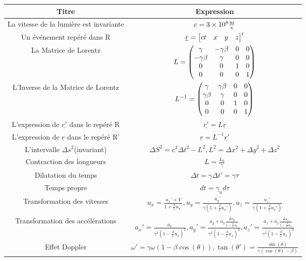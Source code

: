 \documentclass[french]{article}
\begin{document}
	\begin{center}
		\begin{tabular}{| c | c |}
			\hline
			\textbf{Titre} & \textbf{Expression}\\
			\hline
			La vitesse de la lumière est invariante&$c = 3\times10^8 \si{\frac{\meter}{\second}}$\\
			\hline
			Un événement repéré dans R&$ \underline{r}=\mqty[c t& x&y&z]^t $ \\
			\hline
			La Matrice de Lorentz &$L = \mqty(\gamma & -\gamma\beta & 0 & 0 \\ -\gamma\beta& \gamma&0&0\\0&0&1&0\\0&0&0&1)$\\
			\hline
			L'Inverse de la Matrice de Lorentz&$L^{-1} = \mqty(\gamma & \gamma\beta & 0 & 0 \\ \gamma\beta& \gamma&0&0\\0&0&1&0\\0&0&0&1)$\\
			\hline
			L'expression de $\underline{r'}$ dans le repéré R&$\underline{r'}=L\underline{r}$\\
			\hline
			L'expression de $\underline{r}$ dans le repéré R' &$\underline{r}=L^{-1}\underline{r'}$\\
			\hline
			L’intervalle $\Delta s ^2$(invariant)&$\Delta S^2=c^2 \Delta t ^2-L^2, L^2=\Delta x ^2 +\Delta y ^2 + \Delta z ^2$\\
		\hline
		Contraction des longueurs&$L=\frac{L_0}{\gamma}$\\
		\hline
		Dilatation du temps&$\Delta t = \gamma \Delta t' = \gamma \tau$  \\
		\hline
		Temps propre& $dt=\gamma_ud\tau$\\
		\hline
		Transformation des vitesses&$u_x = \frac{u_x'+V}{1 +\frac{\beta}{c}u_x'},
				 u_y = \frac{u_y'}{\gamma(1 +\frac{\beta}{c}u_x')}, 
				 u_z = \frac{u_z'}{\gamma(1 +\frac{\beta}{c}u_x')}$\\
		\hline
Transformation des accélérations&
	$a_x' = \frac{a_x}{\gamma^3\left(1 - \frac{\beta}{c}u_x\right)^3},
	a_y' = \frac{a_y + a_x \frac{\frac{\beta}{c}u_y}{1-\frac{\beta}{c}u_x}}{\gamma ^2\left(1-\frac{\beta}{c}u_x\right)^2}, 
		a_z' = \frac{a_z + a_x \frac{\frac{\beta}{c}u_z}{1-\frac{\beta}{c}u_x}}{\gamma ^2\left(1-\frac{\beta}{c}u_x\right)^2}$	
\\
\hline
Effet Doppler&$\omega'=\gamma\omega\left(1-\beta\cos(\theta)\right),
	\tan(\theta')= \frac{\sin(\theta)}{\gamma\left(\cos(\theta)-\beta\right)}$\\

\end{tabular}
\end{center}
\end{document}
